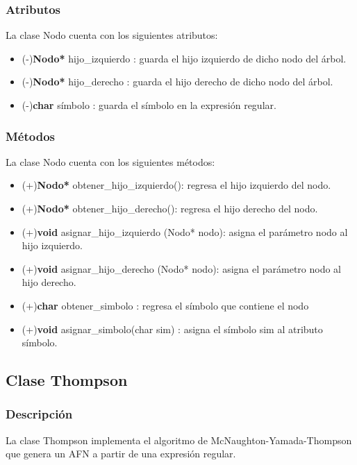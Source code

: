 \documentclass[12pt,letterpaper]{article}
\begin{document}
\subsubsection{Atributos}
La clase Nodo cuenta con los siguientes atributos:
\begin{itemize}
    \item (-)\textbf{Nodo*} hijo\_izquierdo : guarda el hijo izquierdo de dicho nodo del árbol.
    \item (-)\textbf{Nodo*} hijo\_derecho : guarda el hijo derecho de dicho nodo del árbol.
    \item (-)\textbf{char} símbolo : guarda el símbolo en la expresión regular.
\end{itemize}

\subsubsection{Métodos}
La clase Nodo cuenta con los siguientes métodos:
\begin{itemize}
    \item (+)\textbf{Nodo*} obtener\_hijo\_izquierdo(): regresa el hijo izquierdo del nodo.
    \item (+)\textbf{Nodo*} obtener\_hijo\_derecho(): regresa el hijo derecho del nodo.
    \item (+)\textbf{void} asignar\_hijo\_izquierdo (Nodo* nodo): asigna el parámetro nodo al hijo izquierdo.
    \item (+)\textbf{void} asignar\_hijo\_derecho (Nodo* nodo): asigna el parámetro nodo al hijo derecho.
    \item (+)\textbf{char} obtener\_simbolo : regresa el símbolo que contiene el nodo
    \item (+)\textbf{void} asignar\_simbolo(char sim) : asigna el símbolo sim al atributo símbolo. 
\end{itemize}

\subsection{Clase Thompson}

\subsubsection{Descripción}
La clase Thompson implementa el algoritmo de McNaughton-Yamada-Thompson que genera un AFN a partir de una expresión regular. \\
\end{document}
